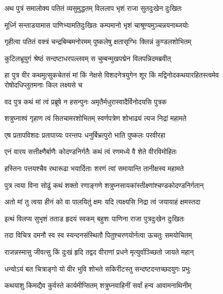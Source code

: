 

\twolineshloka
{अथ पुत्रं समालोक्य पतितं व्यसुमुद्धतम्}
{विललाप भृशं राजा सुतदुःखेन दुःखितः}%

\twolineshloka
{मूर्ध्नि सन्ताडयामास पाणिभ्यामतिदुःखितः}
{कम्पमानो भृशं चाश्रूण्यमुञ्चन्नयनाब्जयोः}%

\twolineshloka
{गृहीत्वा पतितं वक्त्रं चन्द्रबिम्बमनोरमम्}
{पुष्कलेषु क्षतासृग्भिः क्लिन्नं कुण्डलशोभितम्}%

\twolineshloka
{कुटिलभ्रूयुगं श्रेष्ठं सन्दष्टाधरपल्लवम्}
{स चुम्बन्मुखपद्मेन विलपन्निदमब्रवीत्}%

\fourlineindentedshloka
{हा पुत्र वीर कथमुत्सुकचेतसं मां}
{किं नेक्षसे विशदनेत्रयुगेन शूर}
{किं मद्विनोदकथयारहितस्त्वमेव}
{रोषोदधिप्लुतमनाः किल लक्ष्यसे च}%

\twolineshloka
{वद पुत्र कथं मां त्वं प्रब्रूषे न हसन्पुनः}
{अमृतैर्मधुरास्वादैर्विनोदयसि पुत्रक}%

\twolineshloka
{शत्रुघ्नाश्वं गृहाण त्वं सितचामरशोभितम्}
{स्वर्णपत्रेण शोभाढ्यं त्यज निद्रां महामते}%

\twolineshloka
{एष प्रतापविशदः प्रतापाग्र्यः परन्तपः}
{धनुर्बिभ्रत्पुरो भाति पुष्कलः परवीरहा}%

\twolineshloka
{एनं वारय सत्तीक्ष्णैर्बाणैः कोदण्डनिर्गतैः}
{कथं त्वं रणमध्ये वै शेते वीरविमोहितः}%

\twolineshloka
{हस्तिनः पत्तयश्चैव रथारूढा भयार्दिताः}
{शरणं त्वां समायान्ति तानीक्षस्व महामते}%

\twolineshloka
{पुत्र त्वया विना सोढुं कथं शक्तो रणाङ्गणे}
{शत्रुघ्नसायकांस्तीक्ष्णांश्चण्डकोदण्डनिर्गतान्}%

\twolineshloka
{अतो मां तु त्वया हीनं को वा पालयितुं क्षमः}
{यदि त्यक्ष्यसि निद्रा त्वं जयायाहं क्षमस्तदा}%

\twolineshloka
{इत्थं विलप्य सुभृशं तताड हृदयं स्वकम्}
{बहुशः पाणिना राजा पुत्रदुःखेन दुःखितः}%

\twolineshloka
{तदा विचित्र दमनौ स्व स्व स्यन्दनसंस्थितौ}
{पितुश्चरणयोर्नत्वा ऊचतुः समयोचितम्}%

\twolineshloka
{राजन्नस्मासु जीवत्सु किं दुःखं हृदि तद्वद}
{वीराणां प्रधने मृत्युर्वाञ्च्छितो जायते महान्}%

\twolineshloka
{धन्योऽयं बत चित्राङ्गो यो वीर भुवि शोभते}
{सकिरीटस्तु सन्दष्टदन्तच्छदयुगः प्रभुः}%

\twolineshloka
{कथयाशु किमद्यैव कुर्वस्ते कार्यमीप्सितम्}
{शत्रुघ्नवाहिनीं सर्वां हन्व आवामनाथिनीम्}%

